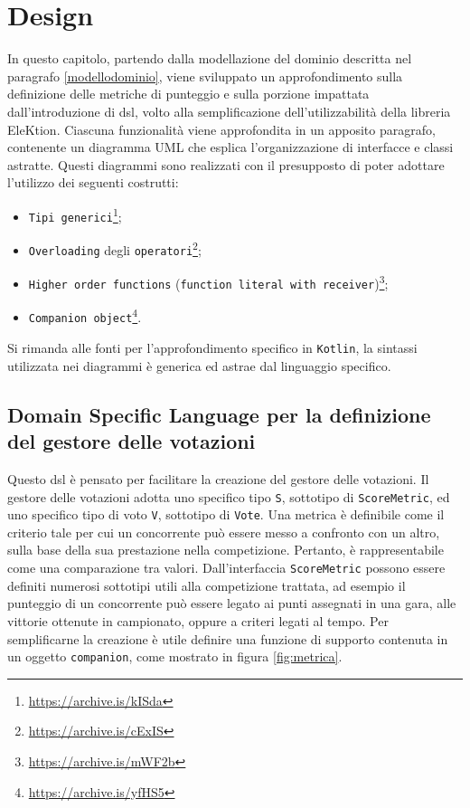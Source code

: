 \documentclass[12pt,a4paper,openright,twoside]{book}
\begin{document}
\chapter{Design}
\label{designdsl}
In questo capitolo, partendo dalla modellazione del dominio descritta nel paragrafo \ref{modellodominio}, 
viene sviluppato un approfondimento sulla definizione delle metriche di punteggio e sulla porzione
impattata dall'introduzione di \ac{dsl}, volto alla semplificazione dell'utilizzabilità della libreria EleKtion.
Ciascuna funzionalità viene approfondita in un apposito paragrafo, contenente un diagramma UML
che esplica l'organizzazione di interfacce e classi astratte.
Questi diagrammi sono realizzati con il presupposto di poter adottare l'utilizzo
dei seguenti costrutti:
\begin{itemize}
\item{\texttt{Tipi generici}\footnote{\url{https://archive.is/kISda}};}
\item{\texttt{Overloading} degli \texttt{operatori}\footnote{\url{https://archive.is/cExIS}};}
\item{\texttt{Higher order functions} (\texttt{function literal with receiver})\footnote{\url{https://archive.is/mWF2b}};}
\item{\texttt{Companion object}\footnote{\url{https://archive.is/yfHS5}}.}
\end{itemize}
Si rimanda alle fonti per l'approfondimento specifico in \texttt{Kotlin}, la sintassi utilizzata nei diagrammi
è generica ed astrae dal linguaggio specifico.
\section{Domain Specific Language per la definizione del gestore delle votazioni }
Questo \ac{dsl} è pensato per facilitare la creazione del gestore delle votazioni.
Il gestore delle votazioni adotta uno specifico tipo \texttt{S}, sottotipo di \texttt{ScoreMetric}, ed uno specifico
tipo di voto \texttt{V}, sottotipo di \texttt{Vote}.
Una metrica è definibile come il criterio tale per cui un concorrente può essere messo a confronto con un altro, sulla base della
sua prestazione nella competizione. Pertanto, è rappresentabile come una comparazione tra valori.
Dall'interfaccia \texttt{ScoreMetric} possono essere definiti numerosi sottotipi utili alla competizione trattata, ad esempio il punteggio di un concorrente
può essere legato ai punti assegnati in una gara, alle vittorie ottenute in campionato, oppure a criteri legati al tempo.
Per semplificarne la creazione è utile definire una funzione di supporto contenuta in un oggetto \texttt{companion}, come mostrato in figura \ref{fig:metrica}.
\end{document}
